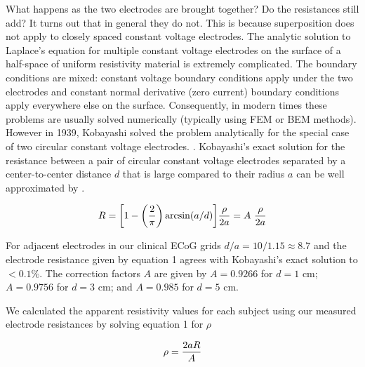 What happens as the two electrodes are brought together? Do the resistances still add? It turns out that in general they do not. This is because superposition does not apply to closely spaced constant voltage electrodes. The analytic solution to Laplace’s equation for multiple constant voltage electrodes on the surface of a half-space of uniform resistivity material is extremely complicated. The boundary conditions are mixed: constant voltage boundary conditions apply under the two electrodes and constant normal derivative (zero current) boundary conditions apply everywhere else on the surface. Consequently, in modern times these  problems are usually solved numerically (typically using FEM or BEM methods). However in 1939, Kobayashi solved the problem analytically for the special  case of two circular constant voltage electrodes. \cite{Kobayashi1939}. Kobayashi’s exact solution for the resistance between a pair of circular constant voltage electrodes separated by a center-to-center distance $d$ that is large compared to their radius $a$ can be well approximated by \cite{Kristiansson2005}.

$$R = \bigg[1 - \bigg({2\over \pi} \bigg) \arcsin(a/d) \bigg]  {\rho \over 2a}  = A \ {\rho \over 2a}$$

For adjacent electrodes in our clinical ECoG grids $d/a =10/1.15 \approx 8.7$ and the electrode resistance given by equation 1 agrees with Kobayashi’s exact  solution to $< 0.1\%$. The correction factors $A$ are given by $A=0.9266$ for $d=1$ cm; $A=0.9756$ for $d=3$ cm; and $A=0.985$ for $d=5$ cm. 

We calculated the apparent resistivity values for each subject using our measured electrode resistances by solving equation 1 for $\rho$

$$\rho = {2 a R \over A} $$



